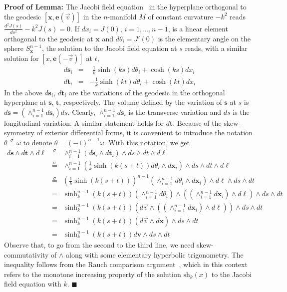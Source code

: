 \documentclass{article}
\newcommand{\s}{{\mathbf s}}
\renewcommand{\t}{{\mathbf t}}
\renewcommand{\v}{{\mathbf v}}
\newcommand{\x}{{\mathbf x}}
\newcommand{\e}{\mathbf{e}}
\newcommand{\sh}{\mathrm{sh}}
\begin{document}
\noindent\textbf{Proof of Lemma:}
The Jacobi field equation~\cite{docarmo} in the hyperplane orthogonal to the geodesic $[\x,\e(\vec{v})]$ 
in the $n$-manifold $M$ of constant curvature $-k^2$ reads $\frac{d^2J(s)}{ds^2}-k^2J(s)=0$. 
If $dx_i=J(0)$, $i=1,...,n-1$, is a linear element orthogonal to the geodesic at $\x$ 
and $d\theta_i=J'(0)$ is the elementary angle on the sphere $S_\x^{n-1}$, 
the solution to the Jacobi field equation at $s$ reads, with a similar solution for $[x,\e(-\vec{v})]$ at $t$, 
\begin{eqnarray*}
d\s_i &=& ~~\frac{1}{k} \sinh (ks) d \theta_i + \cosh (ks) dx_i   \\
d\t_i &=&  -\frac{1}{k} \sinh (kt) d \theta_i + \cosh (kt) dx_i  
\end{eqnarray*}
In the above $d\s_i$, $d\t_i$ are the variations of the geodesic in the orthogonal hyperplane at $\s$, $\t$, respectively.
The volume defined by the variation of $\s$ at $s$ is  $d\s=\left(\wedge_{i=1}^{n-1}d\s_i \right) ds$.   
Clearly, $\wedge_{i=1}^{n-1}d\s_i$ is the transverse variation and $ds$ is the longitudinal variation.  
A similar statement holds for $d\t$.
Because of the skew-symmetry of exterior differential forms, it is convenient to introduce the notation 
$\theta \stackrel{\sigma}{=}\omega$ to denote $\theta =(-1)^{n-1}\omega$. 
With this notation, we get
\begin{eqnarray*}
d\s\wedge d\t \wedge d\ell &\stackrel{\sigma}{=}& \wedge_{i=1}^{n-1}\left( d\s_i \wedge d\t_i \right) \wedge ds \wedge dt \wedge d\ell \\
 &\stackrel{\sigma}{=}& \wedge_{i=1}^{n-1} \left(\frac{1}{k}\sinh (k(s+t)) d\theta_i \wedge d\x_i \right) \wedge ds \wedge dt \wedge d\ell \\
 &\stackrel{\sigma}{=}&\left(\frac{1}{k}\sinh (k(s+t))\right)^{n-1}\left(\wedge_{i=1}^{n-1} d\theta_i \wedge d\x_i \right)\wedge d\ell \wedge ds \wedge dt\\
&=& \sinh_k^{n-1}(k(s+t))(\wedge_{i=1}^{n-1} d\theta_i)\wedge \left(\left(\wedge_{i=1}^{n-1} d\x_i\right) \wedge d\ell\right) \wedge ds \wedge dt\\
&=& \sinh_k^{n-1}(k(s+t))\left(d\vec{v} \wedge ((\wedge_{i=1}^{n-1} d\x_i) \wedge d\ell) \right)\wedge ds \wedge dt\\
&=& \sinh_k^{n-1}(k(s+t))\left(d\vec{v} \wedge d\x\right) \wedge ds \wedge dt\\
&=& \sinh_k^{n-1}(k(s+t))d\v \wedge ds \wedge dt
\end{eqnarray*}
Observe that, to go from the second to the third line, we need skew-commutativity of $\wedge$ along with some elementary hyperbolic trigonometry. 
The inequality follows from the Rauch comparison argument~\cite[VIII, Th. 4.1]{KobayashiNomizu1996b}, 
which in this context refers to the monotone increasing property of the solution $\sh_k(x)$ 
to the Jacobi field equation with $k$.
$\blacksquare$
\end{document}

